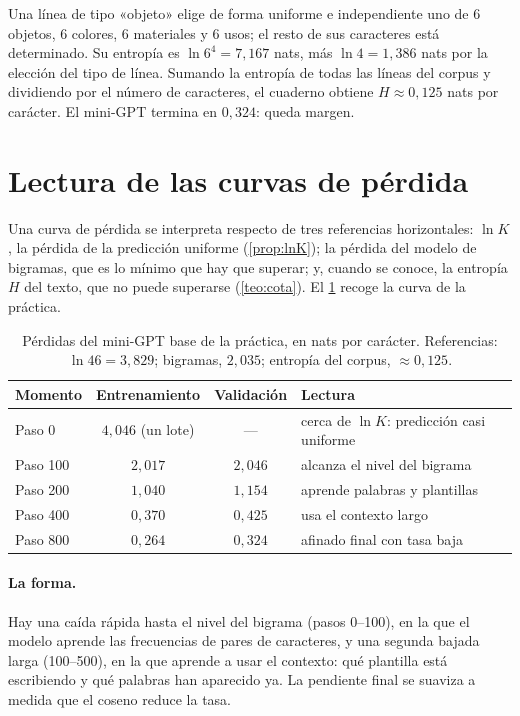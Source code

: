 \begin{ejemplo}\label{ej:entropia-corpus}
Una línea de tipo «objeto» elige de forma uniforme e independiente uno de 6 objetos, 6 colores, 6 materiales y 6 usos; el resto de sus caracteres está determinado. Su entropía es $\ln 6^{4}=7{,}167$ nats, más $\ln 4=1{,}386$ nats por la elección del tipo de línea. Sumando la entropía de todas las líneas del corpus y dividiendo por el número de caracteres, el cuaderno obtiene $H\approx 0{,}125$ nats por carácter. El mini-GPT termina en $0{,}324$: queda margen.
\end{ejemplo}

\section{Lectura de las curvas de pérdida}

Una curva de pérdida se interpreta respecto de tres referencias horizontales: $\ln K$, la pérdida de la predicción uniforme (\cref{prop:lnK}); la pérdida del modelo de bigramas, que es lo mínimo que hay que superar; y, cuando se conoce, la entropía $H$ del texto, que no puede superarse (\cref{teo:cota}). El \cref{tab:curva} recoge la curva de la práctica.

\begin{table}[h]
\centering\small
\caption{Pérdidas del mini-GPT base de la práctica, en nats por carácter. Referencias: $\ln 46=3{,}829$; bigramas, $2{,}035$; entropía del corpus, $\approx 0{,}125$.}\label{tab:curva}
\begin{tabularx}{\textwidth}{@{}lcc>{\raggedright\arraybackslash}X@{}}
\toprule
Momento & Entrenamiento & Validación & Lectura \\
\midrule
Paso 0 & $4{,}046$ (un lote) & --- & cerca de $\ln K$: predicción casi uniforme \\
Paso 100 & $2{,}017$ & $2{,}046$ & alcanza el nivel del bigrama \\
Paso 200 & $1{,}040$ & $1{,}154$ & aprende palabras y plantillas \\
Paso 400 & $0{,}370$ & $0{,}425$ & usa el contexto largo \\
Paso 800 & $0{,}264$ & $0{,}324$ & afinado final con tasa baja \\
\bottomrule
\end{tabularx}
\end{table}

\paragraph{La forma.} Hay una caída rápida hasta el nivel del bigrama (pasos 0--100), en la que el modelo aprende las frecuencias de pares de caracteres, y una segunda bajada larga (100--500), en la que aprende a usar el contexto: qué plantilla está escribiendo y qué palabras han aparecido ya. La pendiente final se suaviza a medida que el coseno reduce la tasa.

